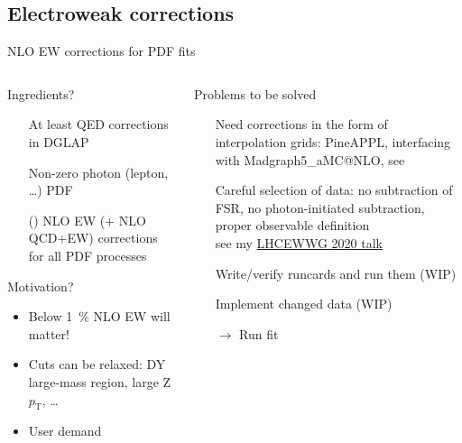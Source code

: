 \author[Christopher Schwan]{}

\subsection{Electroweak corrections}

\begin{frame}{NLO EW corrections for PDF fits}
\fontsize{9}{11}\selectfont
\begin{columns}[onlytextwidth]
\begin{column}{0.45\textwidth}

\begin{block}{Ingredients?}
\begin{itemize}
\item[\ding{51}] At least QED corrections in DGLAP
\item[\ding{51}] Non-zero photon (lepton, \ldots) PDF
\item[(\ding{55})] NLO EW (+ NLO QCD+EW) corrections for all PDF processes
\end{itemize}
\end{block}

\vspace*{0.2cm}

\begin{block}{Motivation?}
\begin{itemize}
\item Below \SI{1}{\percent} NLO EW will matter!
\item Cuts can be relaxed: DY large-mass region, large Z $p_\mathrm{T}$, \ldots
\item User demand
\end{itemize}
\end{block}
\end{column}
\begin{column}{0.45\textwidth}
\begin{block}{Problems to be solved}
\begin{itemize}
\item[\ding{51}] Need corrections in the form of \alert{interpolation grids}: PineAPPL, interfacing with Madgraph5\_aMC@NLO, see\\
\item[\ding{51}] Careful selection of data: no subtraction of FSR, no photon-initiated subtraction, proper observable definition\\
see my \href{https://indico.cern.ch/event/941711/contributions/4020188/}{LHCEWWG 2020 talk}
\item[\ding{55}] Write/verify runcards and run them (WIP)
\item[\ding{55}] Implement changed data (WIP)
\item[$\rightarrow$] Run fit
\end{itemize}
\end{block}
\end{column}
\end{columns}
\end{frame}

